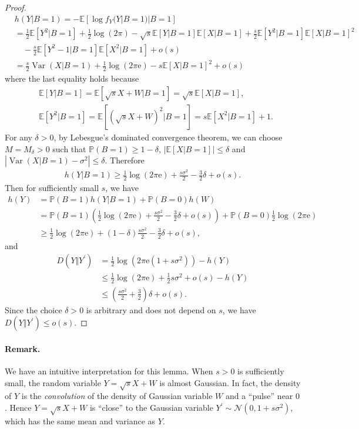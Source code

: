 \documentclass{article}
\numberwithin{equation}{section}
\newcommand{\e}{\mathrm{e}}
\newcommand{\E}{\mathbb{E}}
\newcommand{\bbP}{\mathbb{P}}
\renewcommand{\cal}{\mathcal}
\DeclareMathOperator{\var}{Var}
\theoremstyle{plain}
\theoremstyle{definition}
\begin{document}
\begin{proof}
\begin{align*}
	&h(Y|B=1)=-\E\left[\log f_Y(Y|B=1)|B=1\right]\\
	&=\frac{1}{2}\E[Y^2|B=1]+\frac{1}{2}\log(2\pi)-\sqrt{s}\E[Y|B=1]\E[X|B=1]+\frac{s}{2}\E[Y^2|B=1]\E[X|B=1]^2\\
	&\quad -\frac{s}{2}\E[Y^2-1|B=1]\E[X^2|B=1]+o(s)\\
	&=\frac{s}{2}\var(X|B=1)+\frac{1}{2}\log(2\pi\e)-s\E[X|B=1]^2+o(s)
\end{align*}
where the last equality holds because
\begin{align*}
	&\E[Y|B=1]=\E[\sqrt{s}X+W|B=1]=\sqrt{s}\E[X|B=1],\\
	&\E[Y^2|B=1]=\E\left[(\sqrt{s}X+W)^2|B=1\right]=s\E[X^2|B=1]+1.
\end{align*}
For any $\delta>0$, by Lebesgue's dominated convergence theorem, we can choose $M=M_\delta>0$ such that $\bbP(B=1)\geq 1-\delta$, $\vert\E[X|B=1]\vert\leq\delta$ and $\left\vert\var(X|B=1)-\sigma^2\right\vert\leq\delta$. Therefore
\begin{align*}
	h(Y|B=1)\geq\frac{1}{2}\log(2\pi\e)+\frac{s\sigma^2}{2}-\frac{3}{2}\delta+o(s).
\end{align*}
Then for sufficiently small $s$, we have
\begin{align*}
	h(Y)&=\bbP(B=1)h(Y|B=1)+\bbP(B=0)h(W)\\
	&=\bbP(B=1)\left(\frac{1}{2}\log(2\pi\e)+\frac{s\sigma^2}{2}-\frac{3}{2}\delta+o(s)\right)+\bbP(B=0)\frac{1}{2}\log(2\pi\e)\\
	&\geq\frac{1}{2}\log(2\pi\e)+(1-\delta)\frac{s\sigma^2}{2}-\frac{3}{2}\delta+o(s),
\end{align*}
and
\begin{align*}
	D(Y\Vert Y^\prime)&=\frac{1}{2}\log(2\pi\e(1+s\sigma^2))-h(Y)\\
	&\leq\frac{1}{2}\log(2\pi\e)+\frac{1}{2}s\sigma^2+o(s)-h(Y)\\
	&\leq\left(\frac{s\sigma^2}{2}+\frac{3}{2}\right)\delta+o(s).
\end{align*}
Since the choice $\delta>0$ is arbitrary and does not depend on $s$, we have $D(Y\Vert Y^\prime)\leq o(s)$. 
\end{proof}

\paragraph{Remark.} We have an intuitive interpretation for this lemma. When $s>0$ is sufficiently small, the random variable $Y=\sqrt{s}X+W$ is almost Gaussian. In fact, the density of $Y$ is the \textit{convolution} of the density of Gaussian variable $W$ and a ``pulse'' near $0$. Hence $Y=\sqrt{s}X+W$ is ``close'' to the Gaussian variable $Y^\prime\sim\cal{N}(0,1+s\sigma^2)$, which has the same mean and variance as $Y$.
\end{document}
